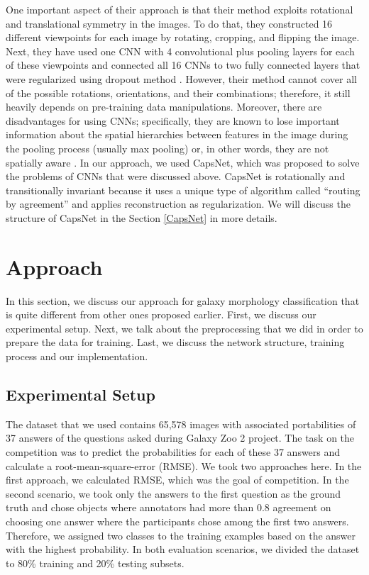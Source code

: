\documentclass[a4paper,fleqn,usenatbib]{mnras}
\begin{document}
One important aspect of their approach is that their method exploits rotational and translational symmetry in the images. To do that, they constructed 16 different viewpoints for each image by rotating, cropping, and flipping the image. Next, they have used one CNN with 4 convolutional plus pooling layers for each of these viewpoints and connected all 16 CNNs to two fully connected layers that were regularized using dropout method \citep{hinton2012improving}. However, their method cannot cover all of the possible rotations, orientations, and their combinations; therefore, it still heavily depends on pre-training data manipulations. Moreover, there are disadvantages for using CNNs; specifically, they are known to lose important information about the spatial hierarchies between features in the image during the pooling process (usually max pooling) or, in other words, they are not spatially aware \citep{sabour2017dynamic}. In our approach, we used CapsNet, which was proposed to solve the problems of CNNs that were discussed above. CapsNet is rotationally and transitionally invariant because it uses a unique type of algorithm called ``routing by agreement'' and applies reconstruction as regularization. We will discuss the structure of CapsNet in the Section \ref{CapsNet} in more details. 

\section{Approach} 
 
In this section, we discuss our approach for galaxy morphology classification that is quite different from other ones proposed earlier. First, we discuss our experimental setup. Next, we talk about the preprocessing that we did in order to prepare the data for training. Last, we discuss the network structure, training process and our implementation.

\subsection{Experimental Setup} \label{ES}

The dataset that we used contains 65,578 images with associated portabilities of 37 answers of the questions asked during Galaxy Zoo 2 project. The task on the competition was to predict the probabilities for each of these 37 answers and calculate a root-mean-square-error (RMSE). We took two approaches here. In the first approach, we calculated RMSE, which was the goal of competition. In the second scenario, we took only the answers to the first question as the ground truth and chose objects where annotators had more than 0.8 agreement on choosing one answer where the participants chose among the first two answers. Therefore, we assigned two classes to the training examples based on the answer with the highest probability. In both evaluation scenarios, we divided the dataset to 80\% training and 20\% testing subsets.  
\end{document}
